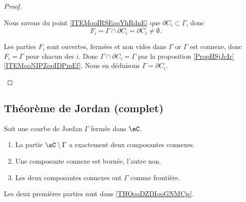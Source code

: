 \begin{proof}
\begin{subproof}
		Nous savons du point \ref{ITEMooIRSEooYhRdnE} que \( \partial C_i\subset \Gamma\), donc
		\begin{equation}
			F_i=\Gamma\cap \partial C_i=\partial C_i\neq \emptyset.
		\end{equation}

		\spitem[Conclusion]
		Les parties \( F_i\) sont ouvertes, fermées et non vides dans \( \Gamma\) or \( \Gamma\) est connexe, donc \( F_i=\Gamma\) pour chacun des \( i\). Donc \( \Gamma\cap\partial C_i=\Gamma\) par la proposition \ref{PropHSjJcIr}\ref{ITEMooNIPZooIDPmEf}. Nous en déduisons \( \Gamma=\partial C_i\).
	\end{subproof}
\end{proof}

\subsection{Théorème de Jordan (complet)}


\begin{theorem}\label{ThoHSPWBuh}
	Soit une courbe de Jordan \( \Gamma\) fermée dans \( \eC\).
	\begin{enumerate}
		\item
		      La partie \( \eC\setminus \Gamma\) a exactement deux composantes connexes.
		\item
		      Une composante connexe est bornée, l'autre non.
		\item
		      Les deux composantes connexes ont \( \Gamma\) comme frontière.
	\end{enumerate}
\end{theorem}

Les deux premières parties sont dans \ref{THOooDZDIooGNMCjs}.
